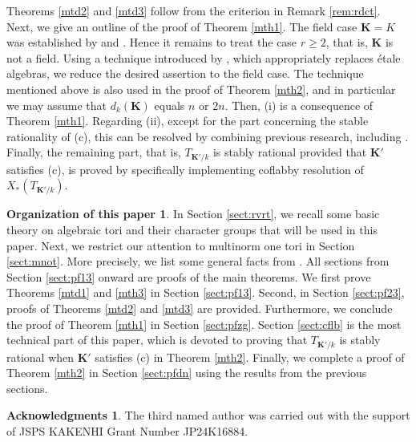 \documentclass[12pt]{amsart}
\theoremstyle{plain}
\theoremstyle{definition}
\newtheorem*{oftp}{Organization of this paper}
\newtheorem*{ack}{Acknowledgments}
\numberwithin{thm}{section}
\numberwithin{equation}{section}
\newcommand{\bK}{\mathbf{K}}
\begin{document}
Theorems \ref{mtd2} and \ref{mtd3} follow from the criterion in Remark \ref{rem:rdct}. Next, we give an outline of the proof of Theorem \ref{mth1}. 
The field case $\bK=K$ was established by \cite{Endo1975} and \cite{Endo2011}.
Hence it remains to treat the case $r\geq 2$, that is, $\bK$ is not a field.
Using a technique introduced by \cite[\S 3, \S 8]{Hasegawa}, 
which appropriately replaces {\'e}tale algebras, we reduce the desired assertion to the field case.
The technique mentioned above is also used in the proof of Theorem \ref{mth2}, and in particular we may assume that $d_{k}(\bK)$ equals $n$ or $2n$. Then, (i) is a consequence of Theorem \ref{mth1}. Regarding (ii), except for the part concerning the stable rationality of (c), this can be resolved by combining previous research, including \cite{Hasegawa}. Finally, the remaining part, that is, $T_{\bK'/k}$ is stably rational provided that $\bK'$ satisfies (c), is proved by specifically implementing coflabby resolution of $X_{*}(T_{\bK'/k})$. 

\begin{oftp}
In Section \ref{sect:rvrt}, we recall some basic theory on algebraic tori and their character groups that will be used in this paper. 
Next, we restrict our attention to multinorm one tori in Section \ref{sect:mnot}. More precisely, we list some general facts from \cite{Hasegawa}. 
All sections from Section \ref{sect:pf13} onward are proofs of the main theorems. 
We first prove Theorems \ref{mtd1} and \ref{mth3} in Section \ref{sect:pf13}. 
Second, in Section \ref{sect:pf23}, proofs of Theorems \ref{mtd2} and \ref{mtd3} are provided. 
Furthermore, we conclude the proof of Theorem \ref{mth1} in Section \ref{sect:pfzg}. 
Section \ref{sect:cflb} is the most technical part of this paper, which is devoted to proving that $T_{\bK'/k}$ is stably rational when $\bK'$ satisfies (c) in Theorem \ref{mth2}. 
Finally, we complete a proof of Theorem \ref{mth2} in Section \ref{sect:pfdn} using the results from the previous sections.
\end{oftp}

\begin{ack}
The third named author was carried out with the support of JSPS KAKENHI Grant Number JP24K16884.
\end{ack}
\end{document}
